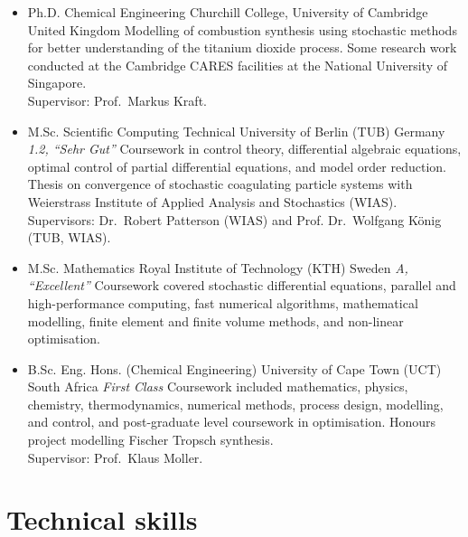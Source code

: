 \documentclass[11pt,a4paper,sans]{moderncv}   %
\def\addls{\vspace{2pt}}
\begin{document}
	\begin{itemize}
		\item{
			{Ph.D. Chemical Engineering}
			{Churchill College, University of Cambridge}
			{United Kingdom}
			{}
			{Modelling of combustion synthesis using stochastic methods for better understanding of the titanium dioxide process. Some research work conducted at the Cambridge CARES facilities at the National University of Singapore. \\
				Supervisor: Prof.~Markus Kraft.}}
		
		\addls
		
		\item{
			{M.Sc. Scientific Computing}
			{Technical University of Berlin (TUB)}
			{Germany}
			{\textit{1.2, ``Sehr Gut''}}
			{Coursework in control theory, differential algebraic equations, optimal control of partial differential equations, and model order reduction. Thesis on convergence of stochastic coagulating particle systems with Weierstrass Institute of Applied Analysis and Stochastics (WIAS).\\
				Supervisors: Dr.~Robert Patterson (WIAS) and Prof. Dr.~Wolfgang K{\"o}nig (TUB, WIAS).}}
		
		\addls
		
		\item{
			{M.Sc. Mathematics}
			{Royal Institute of Technology (KTH)}
			{Sweden}
			{\textit{A, ``Excellent''}}
			{Coursework covered stochastic differential equations, parallel and high-performance computing, fast numerical algorithms, mathematical modelling, finite element and finite volume methods, and non-linear optimisation.}} 
		
		\addls
		
		\item{
			{B.Sc. Eng. Hons. (Chemical Engineering)}
			{University of Cape Town (UCT)}
			{South Africa}
			{\textit{First Class}}
			{Coursework included mathematics, physics, chemistry, thermodynamics, numerical methods, process design, modelling, and control, and post-graduate level coursework in optimisation. Honours project modelling Fischer Tropsch synthesis.\\
				Supervisor: Prof.~Klaus Moller.}}
		
	\end{itemize}
	
	\addls
	
	\section{Technical skills}
	
\end{document}
